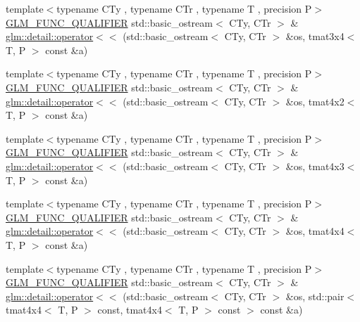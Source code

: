 \begin{DoxyCompactItemize}
\item 
{\footnotesize template$<$typename C\+Ty , typename C\+Tr , typename T , precision P$>$ }\\\hyperlink{setup_8hpp_a33fdea6f91c5f834105f7415e2a64407}{G\+L\+M\+\_\+\+F\+U\+N\+C\+\_\+\+Q\+U\+A\+L\+I\+F\+I\+ER} std\+::basic\+\_\+ostream$<$ C\+Ty, C\+Tr $>$ \& \hyperlink{namespaceglm_1_1detail_ab4fd45d19111c13940e13362f298ebbb}{glm\+::detail\+::operator$<$$<$} (std\+::basic\+\_\+ostream$<$ C\+Ty, C\+Tr $>$ \&os, tmat3x4$<$ T, P $>$ const \&a)
\item 
{\footnotesize template$<$typename C\+Ty , typename C\+Tr , typename T , precision P$>$ }\\\hyperlink{setup_8hpp_a33fdea6f91c5f834105f7415e2a64407}{G\+L\+M\+\_\+\+F\+U\+N\+C\+\_\+\+Q\+U\+A\+L\+I\+F\+I\+ER} std\+::basic\+\_\+ostream$<$ C\+Ty, C\+Tr $>$ \& \hyperlink{namespaceglm_1_1detail_a7904dd03d35422ade8b78de702c30e69}{glm\+::detail\+::operator$<$$<$} (std\+::basic\+\_\+ostream$<$ C\+Ty, C\+Tr $>$ \&os, tmat4x2$<$ T, P $>$ const \&a)
\item 
{\footnotesize template$<$typename C\+Ty , typename C\+Tr , typename T , precision P$>$ }\\\hyperlink{setup_8hpp_a33fdea6f91c5f834105f7415e2a64407}{G\+L\+M\+\_\+\+F\+U\+N\+C\+\_\+\+Q\+U\+A\+L\+I\+F\+I\+ER} std\+::basic\+\_\+ostream$<$ C\+Ty, C\+Tr $>$ \& \hyperlink{namespaceglm_1_1detail_a405128aaaf3a212a90c9b7f5319e10e5}{glm\+::detail\+::operator$<$$<$} (std\+::basic\+\_\+ostream$<$ C\+Ty, C\+Tr $>$ \&os, tmat4x3$<$ T, P $>$ const \&a)
\item 
{\footnotesize template$<$typename C\+Ty , typename C\+Tr , typename T , precision P$>$ }\\\hyperlink{setup_8hpp_a33fdea6f91c5f834105f7415e2a64407}{G\+L\+M\+\_\+\+F\+U\+N\+C\+\_\+\+Q\+U\+A\+L\+I\+F\+I\+ER} std\+::basic\+\_\+ostream$<$ C\+Ty, C\+Tr $>$ \& \hyperlink{namespaceglm_1_1detail_aa9449c71b82aa5546f4ad04283340dbb}{glm\+::detail\+::operator$<$$<$} (std\+::basic\+\_\+ostream$<$ C\+Ty, C\+Tr $>$ \&os, tmat4x4$<$ T, P $>$ const \&a)
\item 
{\footnotesize template$<$typename C\+Ty , typename C\+Tr , typename T , precision P$>$ }\\\hyperlink{setup_8hpp_a33fdea6f91c5f834105f7415e2a64407}{G\+L\+M\+\_\+\+F\+U\+N\+C\+\_\+\+Q\+U\+A\+L\+I\+F\+I\+ER} std\+::basic\+\_\+ostream$<$ C\+Ty, C\+Tr $>$ \& \hyperlink{namespaceglm_1_1detail_a179e4fb74fb7ceef4db326cf290c2ee8}{glm\+::detail\+::operator$<$$<$} (std\+::basic\+\_\+ostream$<$ C\+Ty, C\+Tr $>$ \&os, std\+::pair$<$ tmat4x4$<$ T, P $>$ const, tmat4x4$<$ T, P $>$ const $>$ const \&a)
\end{DoxyCompactItemize}
